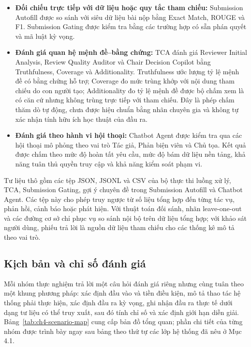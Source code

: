 \begin{itemize}
  \item \textbf{Đối chiếu trực tiếp với dữ liệu hoặc quy tắc tham chiếu:} Submission Autofill được so sánh với siêu dữ liệu bài nộp bằng Exact Match, ROUGE và F1. Submission Gating được kiểm tra bằng các trường hợp có sẵn phán quyết và mã luật kỳ vọng.
  \item \textbf{Đánh giá quan hệ mệnh đề--bằng chứng:} TCA đánh giá Reviewer Initial Analysis, Review Quality Auditor và Chair Decision Copilot bằng Truthfulness, Coverage và Additionality. Truthfulness ước lượng tỷ lệ mệnh đề có bằng chứng hỗ trợ; Coverage đo mức trùng khớp với nội dung tham chiếu do con người tạo; Additionality đo tỷ lệ mệnh đề được bộ chấm xem là có căn cứ nhưng không trùng trực tiếp với tham chiếu. Đây là phép chấm thăm dò tự động, chưa được hiệu chuẩn bằng nhãn chuyên gia và không tự xác nhận tính hữu ích học thuật của đầu ra.
  \item \textbf{Đánh giá theo hành vi hội thoại:} Chatbot Agent được kiểm tra qua các hội thoại mô phỏng theo vai trò Tác giả, Phản biện viên và Chủ tọa. Kết quả được chấm theo mức độ hoàn tất yêu cầu, mức độ bám dữ liệu nền tảng, khả năng tuân thủ quyền truy cập và khả năng kiểm soát phạm vi.
\end{itemize}

Tư liệu thô gồm các tệp JSON, JSONL và CSV của bộ thực thi luồng xử lý, TCA, Submission Gating, gợi ý chuyên đề trong Submission Autofill và Chatbot Agent. Các tệp này cho phép truy ngược từ số liệu tổng hợp đến từng tác vụ, phản hồi, cảnh báo hoặc phát hiện. Với thuật toán đối sánh, nhãn leave-one-out và các đường cơ sở chỉ phục vụ so sánh nội bộ trên dữ liệu tổng hợp; với khảo sát người dùng, phiếu trả lời là nguồn dữ liệu tham chiếu cho các thống kê mô tả theo vai trò.

\subsection{Kịch bản và chỉ số đánh giá}

Mỗi nhóm thực nghiệm trả lời một câu hỏi đánh giá riêng nhưng cùng tuân theo một khung phương pháp: xác định đầu vào và tiền điều kiện, mô tả thao tác hệ thống phải thực hiện, xác định đầu ra kỳ vọng, ghi nhận đầu ra thực tế dưới dạng tư liệu có thể truy xuất, sau đó tính chỉ số và xác định giới hạn diễn giải. Bảng~\ref{tab:ch4-scenario-map} cung cấp bản đồ tổng quan; phần chi tiết của từng nhóm được trình bày ngay sau bảng theo thứ tự các lớp hệ thống đã nêu ở Mục 4.1.


